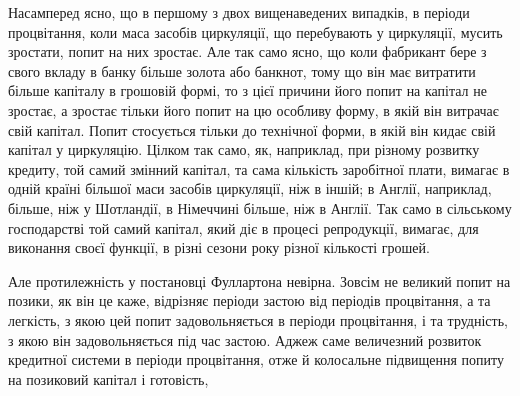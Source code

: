 Насамперед ясно, що в першому з двох вищенаведених випадків, в періоди процвітання, коли маса
засобів циркуляції, що
перебувають у циркуляції, мусить зростати, попит на них зростає. Але так само ясно, що коли
фабрикант бере з свого вкладу
в банку більше золота або банкнот, тому що він має витратити
більше капіталу в грошовій формі, то з цієї причини його попит на капітал не зростає, а зростає
тільки його попит на цю
особливу форму, в якій він витрачає свій капітал. Попит стосується тільки до технічної форми, в якій
він кидає свій капітал у циркуляцію. Цілком так само, як, наприклад, при різному
розвитку кредиту, той самий змінний капітал, та сама кількість
заробітної плати, вимагає в одній країні більшої маси засобів
циркуляції, ніж в іншій; в Англії, наприклад, більше, ніж у
Шотландії, в Німеччині більше, ніж в Англії. Так само в сільському
господарстві той самий капітал, який діє в процесі репродукції,
вимагає, для виконання своєї функції, в різні сезони
року різної кількості грошей.

Але протилежність у постановці Фуллартона невірна. Зовсім
не великий попит на позики, як він це каже, відрізняє періоди
застою від періодів процвітання, а та легкість, з якою цей попит
задовольняється в періоди процвітання, і та трудність, з якою
він задовольняється під час застою. Аджеж саме величезний
розвиток кредитної системи в періоди процвітання, отже й колосальне
підвищення попиту на позиковий капітал і готовість,
\parbreak{}  %
